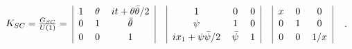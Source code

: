 \begin{equation}\label{KN2}
\begin{tabular}{c|ccc|c|ccc|c|ccc|c}
  & $1$ &$\theta$& $it+\theta\bar\theta/2$&&$1$&$0$&$0$&&$x$&$0$&$0$&\\
$K_{SC}=\frac{G_{SC}}{U(1)}=$&$0$&$1$&$\bar\theta$&&$\psi$&$1$&$0$&&$0$&$1$&$0$\\
  & $0$ &$0$ &$1$&&$ix_1+\psi \bar\psi/2$&$\bar\psi$&$1$&&$0$&$0$&$1/x$&\\
\end{tabular}\\.
\end{equation}

